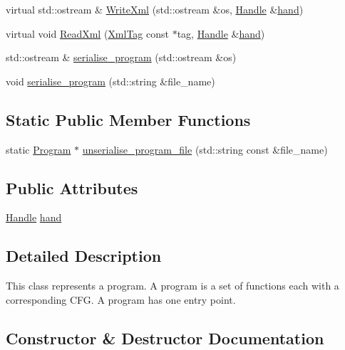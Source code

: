 \begin{DoxyCompactItemize}
\item 
virtual std\+::ostream \& \hyperlink{classcfglib_1_1Program_af18db304f16fea3e395fbeb7d6a7b358}{Write\+Xml} (std\+::ostream \&os, \hyperlink{classcfglib_1_1Handle}{Handle} \&\hyperlink{classcfglib_1_1Program_a13cc0a03cdf31ab9cfa9a0a7b0dff8ed}{hand})
\item 
virtual void \hyperlink{classcfglib_1_1Program_ad854304f1126c700757fb461a36c8cbd}{Read\+Xml} (\hyperlink{classXmlTag}{Xml\+Tag} const $\ast$tag, \hyperlink{classcfglib_1_1Handle}{Handle} \&\hyperlink{classcfglib_1_1Program_a13cc0a03cdf31ab9cfa9a0a7b0dff8ed}{hand})
\item 
std\+::ostream \& \hyperlink{classcfglib_1_1Program_a50b65e054b0e6c2a6517e1f7c8a34379}{serialise\+\_\+program} (std\+::ostream \&os)
\item 
void \hyperlink{classcfglib_1_1Program_a2eb2e99e2d6dfbb346e23bebba01d2b3}{serialise\+\_\+program} (std\+::string \&file\+\_\+name)
\end{DoxyCompactItemize}
\subsection*{Static Public Member Functions}
\begin{DoxyCompactItemize}
\item 
static \hyperlink{classcfglib_1_1Program}{Program} $\ast$ \hyperlink{classcfglib_1_1Program_af486d3bd0aac88830c13289e5a416f07}{unserialise\+\_\+program\+\_\+file} (std\+::string const \&file\+\_\+name)
\end{DoxyCompactItemize}
\subsection*{Public Attributes}
\begin{DoxyCompactItemize}
\item 
\hyperlink{classcfglib_1_1Handle}{Handle} \hyperlink{classcfglib_1_1Program_a13cc0a03cdf31ab9cfa9a0a7b0dff8ed}{hand}
\end{DoxyCompactItemize}


\subsection{Detailed Description}
This class represents a program. A program is a set of functions each with a corresponding C\+FG. A program has one entry point. 

\subsection{Constructor \& Destructor Documentation}
\mbox{\label{classcfglib_1_1Program_ad18f1e51efad67f4d553e1de3d5aea55}} 
